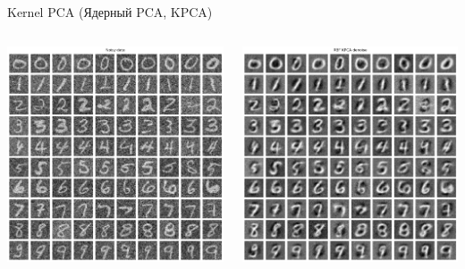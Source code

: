\begin{frame}[allowframebreaks]{Kernel PCA (Ядерный PCA, KPCA)}
    \begin{columns}
        \begin{center}
            \includegraphics[width=1\textwidth]{../resources/kpca/mnist_noisy.png}
        \end{center}

        \begin{center}
            \includegraphics[width=1\textwidth]{../resources/kpca/mnist_denoise_kpca.png}
        \end{center}
    \end{columns}
\end{frame}

